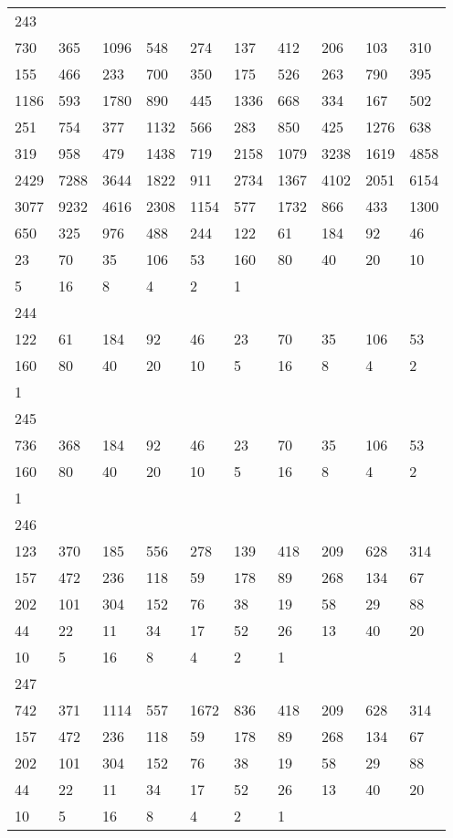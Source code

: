 \begin{longtable}{*{10}{l}}
243&&&&&&&&&\\
730& 365& 1096& 548& 274& 137& 412& 206& 103& 310\\
155& 466& 233& 700& 350& 175& 526& 263& 790& 395\\
1186& 593& 1780& 890& 445& 1336& 668& 334& 167& 502\\
251& 754& 377& 1132& 566& 283& 850& 425& 1276& 638\\
319& 958& 479& 1438& 719& 2158& 1079& 3238& 1619& 4858\\
2429& 7288& 3644& 1822& 911& 2734& 1367& 4102& 2051& 6154\\
3077& 9232& 4616& 2308& 1154& 577& 1732& 866& 433& 1300\\
650& 325& 976& 488& 244& 122& 61& 184& 92& 46\\
23& 70& 35& 106& 53& 160& 80& 40& 20& 10\\
5& 16& 8& 4& 2& 1& \\

244&&&&&&&&&\\
122& 61& 184& 92& 46& 23& 70& 35& 106& 53\\
160& 80& 40& 20& 10& 5& 16& 8& 4& 2\\
1& \\

245&&&&&&&&&\\
736& 368& 184& 92& 46& 23& 70& 35& 106& 53\\
160& 80& 40& 20& 10& 5& 16& 8& 4& 2\\
1& \\

246&&&&&&&&&\\
123& 370& 185& 556& 278& 139& 418& 209& 628& 314\\
157& 472& 236& 118& 59& 178& 89& 268& 134& 67\\
202& 101& 304& 152& 76& 38& 19& 58& 29& 88\\
44& 22& 11& 34& 17& 52& 26& 13& 40& 20\\
10& 5& 16& 8& 4& 2& 1& \\

247&&&&&&&&&\\
742& 371& 1114& 557& 1672& 836& 418& 209& 628& 314\\
157& 472& 236& 118& 59& 178& 89& 268& 134& 67\\
202& 101& 304& 152& 76& 38& 19& 58& 29& 88\\
44& 22& 11& 34& 17& 52& 26& 13& 40& 20\\
10& 5& 16& 8& 4& 2& 1& \\


\end{longtable}
